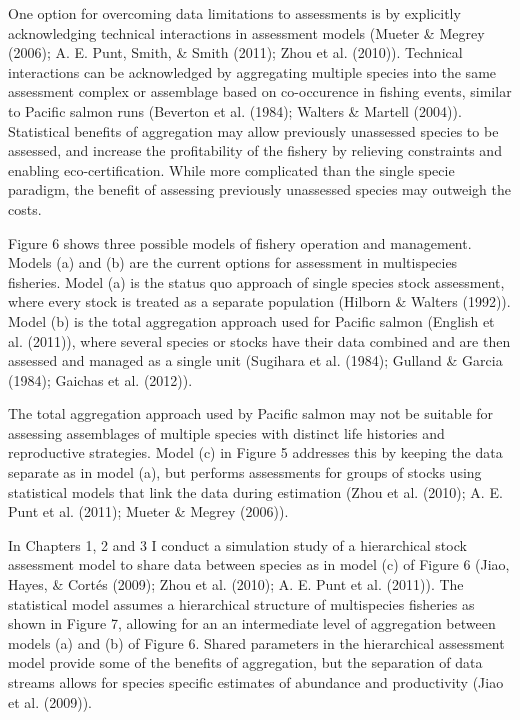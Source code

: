 \documentclass[12pt,]{scrartcl}
\begin{document}
One option for overcoming data limitations to assessments is by
explicitly acknowledging technical interactions in assessment models
(Mueter \& Megrey (2006); A. E. Punt, Smith, \& Smith (2011); Zhou et
al. (2010)). Technical interactions can be acknowledged by aggregating
multiple species into the same assessment complex or assemblage based on
co-occurence in fishing events, similar to Pacific salmon runs (Beverton
et al. (1984); Walters \& Martell (2004)). Statistical benefits of
aggregation may allow previously unassessed species to be assessed, and
increase the profitability of the fishery by relieving constraints and
enabling eco-certification. While more complicated than the single
specie paradigm, the benefit of assessing previously unassessed species
may outweigh the costs.

Figure 6 shows three possible models of fishery operation and
management. Models (a) and (b) are the current options for assessment in
multispecies fisheries. Model (a) is the status quo approach of single
species stock assessment, where every stock is treated as a separate
population (Hilborn \& Walters (1992)). Model (b) is the total
aggregation approach used for Pacific salmon (English et al. (2011)),
where several species or stocks have their data combined and are then
assessed and managed as a single unit (Sugihara et al. (1984); Gulland
\& Garcia (1984); Gaichas et al. (2012)).

The total aggregation approach used by Pacific salmon may not be
suitable for assessing assemblages of multiple species with distinct
life histories and reproductive strategies. Model (c) in Figure 5
addresses this by keeping the data separate as in model (a), but
performs assessments for groups of stocks using statistical models that
link the data during estimation (Zhou et al. (2010); A. E. Punt et al.
(2011); Mueter \& Megrey (2006)).

In Chapters 1, 2 and 3 I conduct a simulation study of a hierarchical
stock assessment model to share data between species as in model (c) of
Figure 6 (Jiao, Hayes, \& Cortés (2009); Zhou et al. (2010); A. E. Punt
et al. (2011)). The statistical model assumes a hierarchical structure
of multispecies fisheries as shown in Figure 7, allowing for an an
intermediate level of aggregation between models (a) and (b) of Figure
6. Shared parameters in the hierarchical assessment model provide some
of the benefits of aggregation, but the separation of data streams
allows for species specific estimates of abundance and productivity
(Jiao et al. (2009)).
\end{document}
